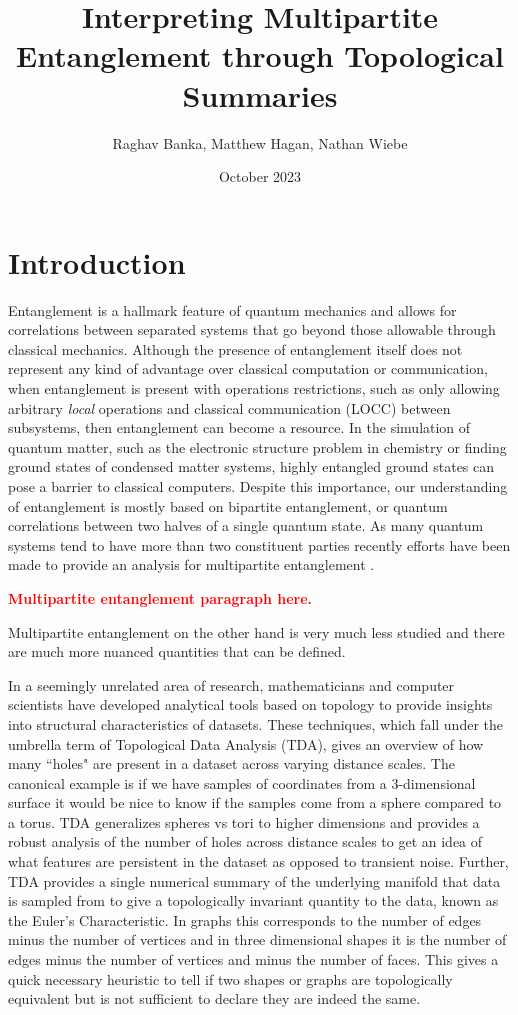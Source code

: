 \documentclass{article}
\title{Interpreting Multipartite Entanglement through Topological Summaries}
\author{Raghav Banka, Matthew Hagan, Nathan Wiebe}
\date{October 2023}
\begin{document}
\maketitle

\section{Introduction}
Entanglement is a hallmark feature of quantum mechanics and allows for correlations between separated systems that go beyond those allowable through classical mechanics. Although the presence of entanglement itself does not represent any kind of advantage over classical computation or communication, when entanglement is present with operations restrictions, such as only allowing arbitrary \emph{local} operations and classical communication (LOCC) between subsystems, then entanglement can become a resource. In the simulation of quantum matter, such as the electronic structure problem in chemistry or finding ground states of condensed matter systems, highly entangled ground states can pose a barrier to classical computers. Despite this importance, our understanding of entanglement is mostly based on bipartite entanglement, or quantum correlations between two halves of a single quantum state. As many quantum systems tend to have more than two constituent parties recently efforts have been made to provide an analysis for multipartite entanglement \cite{horodecki2024multipartiteentanglement}. 

\textcolor{red}{\textbf{Multipartite entanglement paragraph here.}}

Multipartite entanglement on the other hand is very much less studied and there are much more nuanced quantities that can be defined.

In a seemingly unrelated area of research, mathematicians and computer scientists have developed analytical tools based on topology to provide insights into structural characteristics of datasets. These techniques, which fall under the umbrella term of Topological Data Analysis (TDA), gives an overview of how many ``holes" are present in a dataset across varying distance scales. The canonical example is if we have samples of coordinates from a 3-dimensional surface it would be nice to know if the samples come from a sphere compared to a torus. TDA generalizes spheres vs tori to higher dimensions and provides a robust analysis of the number of holes across distance scales to get an idea of what features are persistent in the dataset as opposed to transient noise. Further, TDA provides a single numerical summary of the underlying manifold that data is sampled from to give a topologically invariant quantity to the data, known as the Euler's Characteristic. In graphs this corresponds to the number of edges minus the number of vertices and in three dimensional shapes it is the number of edges minus the number of vertices and minus the number of faces. This gives a quick necessary heuristic to tell if two shapes or graphs are topologically equivalent but is not sufficient to declare they are indeed the same. 
\end{document}
